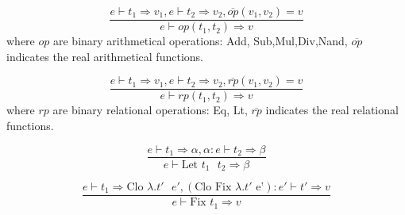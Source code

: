 \documentclass[10pt]{article}
\begin{document}
\begin{equation*}
\frac{ e\vdash t_1 \Rightarrow v_1, e\vdash t_2 \Rightarrow v_2, \overline{op}(v_1,v_2) = v}{e \vdash op(t_1,t_2) \Rightarrow v}
\end{equation*}
where $op$ are binary arithmetical operations: Add, Sub,Mul,Div,Nand, $\overline{op}$ indicates the real arithmetical functions.

\begin{equation*}
\frac{ e\vdash t_1 \Rightarrow v_1, e\vdash t_2 \Rightarrow v_2, \overline{rp}(v_1,v_2) = v}{e \vdash rp(t_1,t_2) \Rightarrow v}
\end{equation*}
where $rp$ are binary relational operations: Eq, Lt, $\overline{rp}$ indicates the real relational functions.

\begin{equation*}
\frac{e \vdash t_1 \Rightarrow \alpha, \alpha:e \vdash t_2 \Rightarrow \beta}{e \vdash \text{Let $t_1$ $t_2$} \Rightarrow \beta}
\end{equation*}

\begin{equation*}
\frac{e \vdash t_1 \Rightarrow \text{Clo $\lambda.t'$ $e'$}, (\text{Clo Fix $\lambda.t'$ e'}) : e' \vdash t' \Rightarrow v}{e \vdash \text{Fix $t_1$} \Rightarrow v}
\end{equation*}
\end{document}
